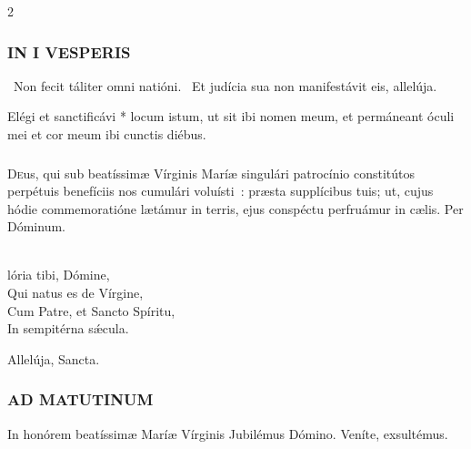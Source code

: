 \documentclass[9pt,twoside]{extarticle}
\begin{document}
\begin{multicols}{2}

{\small {}}

\subsubsection*{\center \normalfont \textsc{IN I VESPERIS}}

\smallskip
{}

~Non fecit táliter omni natióni. ~Et judícia sua non manifestávit eis, allelúja.

 Elégi et sanctificávi * locum istum, ut sit ibi nomen meum, et permáneant óculi mei et cor meum ibi cunctis diébus.

\subsubsection*{\center {}}
\lettrine{D}eus, qui sub beatíssimæ Vírginis Maríæ singulári patrocínio constitútos perpétuis benefíciis nos cumulári voluísti~: præsta supplícibus tuis; ut, cujus hódie commemoratióne lætámur in terris, ejus conspéctu perfruámur in cælis. Per Dóminum.

\small {}


\\
lória tibi, Dómine,\\
Qui natus es de Vírgine,\\
Cum Patre, et Sancto Spíritu,\\
In sempitérna sǽcula.

 Allelúja, Sancta.

\normalsize

\subsubsection*{\center \normalfont \textsc{AD MATUTINUM}}

\smallskip
\indent {} In honórem beatíssimæ Maríæ Vírginis \textred{*} Jubilémus Dómino.  Veníte, exsultémus. 


\end{multicols}
\end{document}
